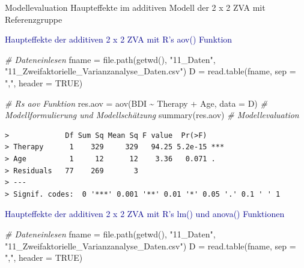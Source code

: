 \documentclass[
  8pt,
  ignorenonframetext,
]{beamer}
\newenvironment{Shaded}{\begin{snugshade}}{\end{snugshade}}
\newcommand{\AttributeTok}[1]{\textcolor[rgb]{0.77,0.63,0.00}{#1}}
\newcommand{\CommentTok}[1]{\textcolor[rgb]{0.56,0.35,0.01}{\textit{#1}}}
\newcommand{\ConstantTok}[1]{\textcolor[rgb]{0.00,0.00,0.00}{#1}}
\newcommand{\FunctionTok}[1]{\textcolor[rgb]{0.00,0.00,0.00}{#1}}
\newcommand{\NormalTok}[1]{#1}
\newcommand{\OtherTok}[1]{\textcolor[rgb]{0.56,0.35,0.01}{#1}}
\newcommand{\SpecialCharTok}[1]{\textcolor[rgb]{0.00,0.00,0.00}{#1}}
\newcommand{\StringTok}[1]{\textcolor[rgb]{0.31,0.60,0.02}{#1}}
\begin{document}
\begin{frame}[fragile]{\small Modellevaluation \textbar{} Haupteffekte
im additiven Modell der 2 x 2 ZVA mit Referenzgruppe}
\protect\hypertarget{modellevaluation-haupteffekte-im-additiven-modell-der-2-x-2-zva-mit-referenzgruppe-4}{}
\small

\textcolor{darkblue}{Haupteffekte der additiven 2 x 2 ZVA mit R's aov() Funktion}
\tiny {} \vspace{1mm}

\begin{Shaded}
\begin{Highlighting}[]
\CommentTok{\# Dateneinlesen}
\NormalTok{fname      }\OtherTok{=} \FunctionTok{file.path}\NormalTok{(}\FunctionTok{getwd}\NormalTok{(), }\StringTok{"11\_Daten"}\NormalTok{, }\StringTok{"11\_Zweifaktorielle\_Varianzanalyse\_Daten.csv"}\NormalTok{)}
\NormalTok{D          }\OtherTok{=} \FunctionTok{read.table}\NormalTok{(fname, }\AttributeTok{sep =} \StringTok{","}\NormalTok{, }\AttributeTok{header =} \ConstantTok{TRUE}\NormalTok{)}

\CommentTok{\# R\textquotesingle{}s aov Funktion}
\NormalTok{res.aov    }\OtherTok{=} \FunctionTok{aov}\NormalTok{(BDI }\SpecialCharTok{\textasciitilde{}}\NormalTok{ Therapy }\SpecialCharTok{+}\NormalTok{ Age, }\AttributeTok{data =}\NormalTok{ D)                }\CommentTok{\# Modellformulierung und Modellschätzung}
\FunctionTok{summary}\NormalTok{(res.aov)                                               }\CommentTok{\# Modellevaluation}
\end{Highlighting}
\end{Shaded}

\begin{verbatim}
>             Df Sum Sq Mean Sq F value  Pr(>F)    
> Therapy      1    329     329   94.25 5.2e-15 ***
> Age          1     12      12    3.36   0.071 .  
> Residuals   77    269       3                    
> ---
> Signif. codes:  0 '***' 0.001 '**' 0.01 '*' 0.05 '.' 0.1 ' ' 1
\end{verbatim}

\vspace{2mm}

\small

\textcolor{darkblue}{Haupteffekte der additiven 2 x 2 ZVA mit R's lm() und anova() Funktionen}
\tiny {} \vspace{1mm}

\begin{Shaded}
\begin{Highlighting}[]
\CommentTok{\# Dateneinlesen}
\NormalTok{fname      }\OtherTok{=} \FunctionTok{file.path}\NormalTok{(}\FunctionTok{getwd}\NormalTok{(), }\StringTok{"11\_Daten"}\NormalTok{, }\StringTok{"11\_Zweifaktorielle\_Varianzanalyse\_Daten.csv"}\NormalTok{)}
\NormalTok{D          }\OtherTok{=} \FunctionTok{read.table}\NormalTok{(fname, }\AttributeTok{sep =} \StringTok{","}\NormalTok{, }\AttributeTok{header =} \ConstantTok{TRUE}\NormalTok{)}


\end{Highlighting}
\end{Shaded}
\end{frame}
\end{document}
